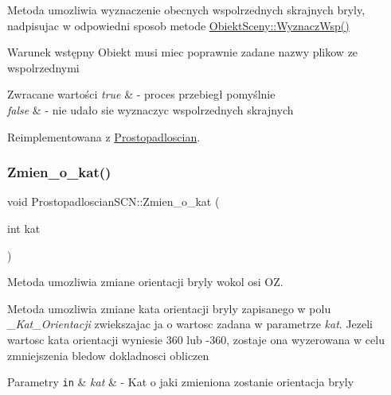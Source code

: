Metoda umozliwia wyznaczenie obecnych wspolrzednych skrajnych bryly, nadpisujac w odpowiedni sposob metode \hyperlink{classObiektSceny_a24dd0332c0755d7155128639a9a3e2b4}{Obiekt\+Sceny\+::\+Wyznacz\+Wsp()}

\begin{DoxyPrecond}{Warunek wstępny}
Obiekt musi miec poprawnie zadane nazwy plikow ze wspolrzednymi 
\end{DoxyPrecond}

\begin{DoxyRetVals}{Zwracane wartości}
{\em true} & -\/ proces przebiegł pomyślnie \\
\hline
{\em false} & -\/ nie udało sie wyznaczyc wspolrzednych skrajnych \\
\hline
\end{DoxyRetVals}


Reimplementowana z \hyperlink{classProstopadloscian_a9d182fd3d875a1e3928c8972727be6fe}{Prostopadloscian}.

\mbox{\label{classProstopadloscianSCN_a1f9b715a50dd0e84fb6391dcccc962e8}} 
\subsubsection{\texorpdfstring{Zmien\+\_\+o\+\_\+kat()}{Zmien\_o\_kat()}}
{\footnotesize\ttfamily void Prostopadloscian\+S\+C\+N\+::\+Zmien\+\_\+o\+\_\+kat (\begin{DoxyParamCaption}\item[{int}]{kat }\end{DoxyParamCaption})}



Metoda umozliwia zmiane orientacji bryly wokol osi OZ. 

Metoda umozliwia zmiane kata orientacji bryly zapisanego w polu {\itshape \+\_\+\+Kat\+\_\+\+Orientacji} zwiekszajac ja o wartosc zadana w parametrze {\itshape kat}. Jezeli wartosc kata orientacji wyniesie 360 lub -\/360, zostaje ona wyzerowana w celu zmniejszenia bledow dokladnosci obliczen


\begin{DoxyParams}[1]{Parametry}
\mbox{\tt in}  & {\em kat} & -\/ Kat o jaki zmieniona zostanie orientacja bryly \\
\hline
\end{DoxyParams}
\mbox{\label{classProstopadloscianSCN_afa54ddf8455489f51aa945afcafee27f}} 
